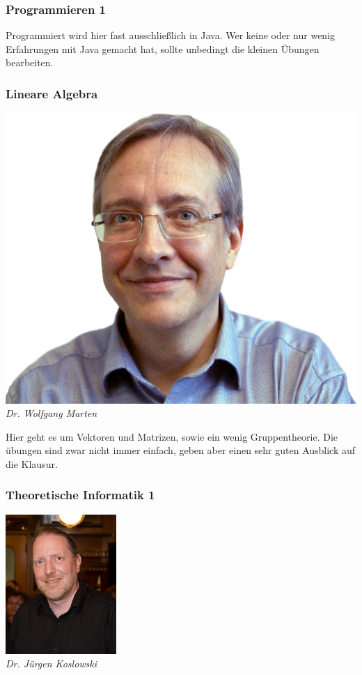 \subsubsection{Programmieren 1}

Programmiert wird hier fast ausschließlich in Java. Wer keine oder nur wenig Erfahrungen mit Java gemacht hat, sollte unbedingt die kleinen Übungen bearbeiten.

\subsubsection{Lineare Algebra}

\includegraphics[width=0.8\linewidth]{bilder/dozenten/marten_frei.png}\\
\textit{Dr. Wolfgang Marten}

Hier geht es um Vektoren und Matrizen, sowie ein wenig Gruppentheorie.
Die übungen sind zwar nicht immer einfach, geben aber einen sehr guten Ausblick auf die Klausur.

\subsubsection{Theoretische Informatik 1}

\includegraphics[width=0.6\linewidth]{bilder/dozenten/koslowski.png}\\
\textit{Dr. Jürgen Koslowski}

